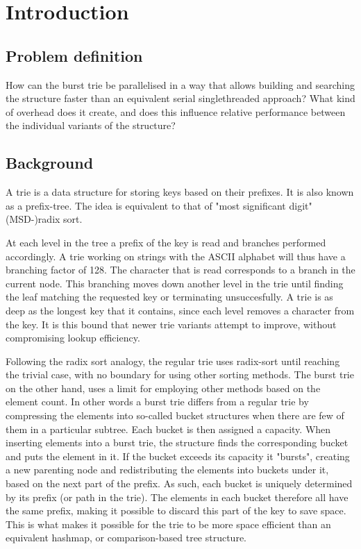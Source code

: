 \chapter{Introduction}

\section{Problem definition}
How can the burst trie be parallelised in a way that allows building and searching
the structure faster than an equivalent serial singlethreaded approach?
What kind of overhead does it create, and does this influence relative
performance between the individual variants of the structure?


\section{Background}
A trie is a data structure for storing keys based on their prefixes.
It is also known as a prefix-tree. The idea is equivalent to that of
"most significant digit" (MSD-)radix sort.

At each level in the tree a prefix of the key is read and branches performed
accordingly. A trie working on strings with the ASCII alphabet will thus have a
branching factor of 128. The character that is read corresponds to a branch in
the current node. This branching moves down another level in the trie until
finding the leaf matching the requested key or terminating unsuccesfully. A
trie is as deep as the longest key that it contains, since each level removes a
character from the key. It is this bound that newer trie variants attempt to
improve, without compromising lookup efficiency.

Following the radix sort analogy, the regular trie uses radix-sort until
reaching the trivial case, with no boundary for using other sorting methods.
The burst trie on the other hand, uses a limit for employing other methods
based on the element count. In other words a burst trie differs from a regular
trie by compressing the elements into so-called bucket structures when
there are few of them in a particular subtree. Each bucket is then assigned a
capacity. When inserting elements into a burst trie, the structure finds the
corresponding bucket and puts the element in it. If the bucket exceeds its
capacity it "bursts", creating a new parenting node and redistributing the
elements into buckets under it, based on the next part of the prefix. As such,
each bucket is uniquely determined by its prefix (or path in the trie). The
elements in each bucket therefore all have the same prefix, making it possible
to discard this part of the key to save space. This is what makes it possible
for the trie to be more space efficient than an equivalent hashmap, or
    comparison-based tree structure.

